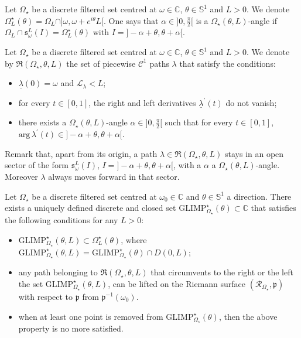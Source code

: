 \documentclass[11pt, english]{smfart}
\theoremstyle{definition}
\begin{document}
\begin{defi}
Let  $\Omega_\star$ be a discrete filtered set centred at
$\omega \in \mathbb{C}$,  $\theta \in \mathbb{S}^1$ and $L>0$. We
denote $\Omega_L^\star(\theta) = \Omega_L \cap ]\omega, \omega + e^{i\theta }L[$.
One says that $\alpha \in ]0,\frac{\pi}{2}[$ is 
a $\Omega_\star(\theta,L)$-angle if
$\Omega_L \cap { {\boldsymbol{\mathfrak{s}}} }{_\omega^L}(I) = \Omega_L^\star(\theta)$
with $I=]-\alpha+\theta, \theta+\alpha[$.
\end{defi}

\begin{defi}\label{Allpaththeta}
Let  $\Omega_\star$ be a discrete filtered set centred at
$\omega \in \mathbb{C}$, $\theta \in \mathbb{S}^1$  and $L>0$.
We denote by $\mathfrak{R}(\Omega_\star, \theta,L)$ the set of
piecewise $\mathcal{C}^1$  paths $\lambda$ that satisfy the conditions:
\begin{itemize}
\item $\underline{\lambda}(0) = \omega$ and $\mathcal{L}_\lambda < L$;
\item  for every $t\in[0,1]$,  the right and left derivatives
  $\underline{\lambda}^\prime(t)$ do not  vanish;
\item there exists a $\Omega_\star(\theta,L)$-angle $\alpha \in
  ]0,\frac{\pi}{2}[$  such that for every $t \in [0,1]$,
${\mathrm{arg}  \, \lambda^\prime(t)  \in
  ]-\alpha+\theta, \theta +\alpha[}$.
\end{itemize}
\end{defi}

Remark that, apart from its origin, a path 
$\lambda \in \mathfrak{R}(\Omega_\star, \theta, L)$
stays in an open sector of the form
 ${ {\boldsymbol{\mathfrak{s}}} }{_\omega^L}(I)$, $I=]-\alpha+\theta, \theta+\alpha[$, with a
$\alpha$  a $\Omega_\star(\theta,L)$-angle. Moreover $\lambda$ always moves
forward in that sector.

\begin{prop}\label{propglimp}
Let  $\Omega_\star$ be a discrete filtered set centred at
$\omega_0 \in \mathbb{C}$ and $\theta \in \mathbb{S}^1$ a direction. 
There exists a uniquely defined discrete and closed set
$\mathrm{GLIMP}_{\Omega_\star}^\star(\theta) \subset \mathbb{C}$ that satisfies the
following conditions for any $L>0$:
\begin{itemize}
\item $\displaystyle
\mathrm{GLIMP}_{\Omega_\star}^\star(\theta,L)  \subset \Omega_L^\star(\theta)$, where
${\mathrm{GLIMP}_{\Omega_\star}^\star(\theta,L) =
  \mathrm{GLIMP}_{\Omega_\star}^\star(\theta) \cap D(0,L)}$;
\item  any path
belonging to $\mathfrak{R}(\Omega_\star, \theta, L)$ that
circumvents to the right or the left the set
$\mathrm{GLIMP}_{\Omega_\star}^\star(\theta,L)$, can be lifted on the
Riemann surface $(\mathscr{R}_{\Omega_\star},\mathfrak{p})$ 
with respect to $\mathfrak{p}$ from $\mathfrak{p}^{-1} (\omega_0)$.
\item when at least one point is removed from $\mathrm{GLIMP}_{\Omega_\star}^\star(\theta)$,
  then the above property is no more satisfied.
\end{itemize}
\end{prop}
\end{document}
